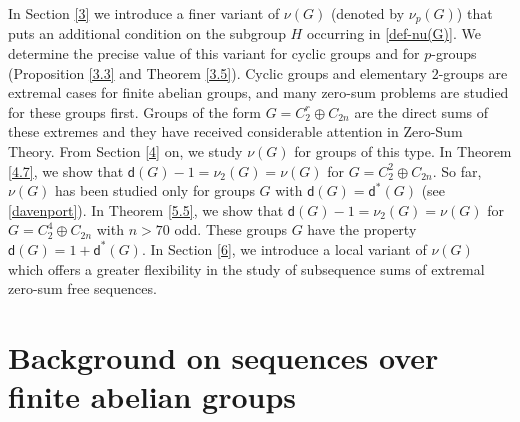 \documentclass[a4paper, 10pt]{amsart}
\theoremstyle{plain}
\theoremstyle{definition}
\numberwithin{equation}{section}
\begin{document}
In Section \ref{3} we introduce a finer variant of $\nu (G)$ (denoted by $\nu_p (G)$) that puts an additional condition on the subgroup $H$ occurring in \eqref{def-nu(G)}. We determine the precise value of this variant for cyclic groups and for $p$-groups (Proposition \ref{3.3} and Theorem \ref{3.5}). 
Cyclic groups and elementary $2$-groups are extremal cases for finite abelian groups, and many zero-sum problems are studied for these groups first. Groups of the form $G = C_2^r \oplus C_{2n}$ are the direct sums of these extremes and they have received considerable attention in Zero-Sum Theory. From Section \ref{4} on,  we study  $\nu (G)$  for groups of this type. In Theorem \ref{4.7}, we show that $\mathsf d (G)-1= \nu_2 (G) = \nu (G)$ for $G = C_2^2 \oplus C_{2n}$.
So far, $\nu (G)$ has been studied only for groups $G$ with $\mathsf d (G) =\mathsf d^* (G)$ (see \eqref{davenport}). In Theorem \ref{5.5}, we show that $\mathsf d (G)-1= \nu_2 (G) = \nu (G)$ for $G = C_2^4 \oplus C_{2n}$ with $n > 70$ odd. These  groups $G$ have the property $\mathsf d (G) = 1+ \mathsf d^* (G)$. In Section \ref{6}, we introduce a local variant of $\nu (G)$ which offers a greater flexibility in the  study of subsequence sums of extremal zero-sum free sequences.

\smallskip
\section{Background on  sequences over finite abelian groups} \label{2}
\smallskip
\end{document}
